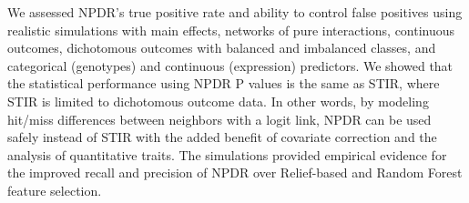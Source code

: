 \documentclass{bioinfo}
\begin{document}
We assessed NPDR's true positive rate and ability to control false positives using realistic simulations with main effects, networks of pure interactions, continuous outcomes, dichotomous outcomes with balanced and imbalanced classes, and categorical (genotypes) and continuous (expression) predictors.
We showed that the statistical performance using NPDR P values is the same as STIR, where STIR is limited to dichotomous outcome data.
In other words, by modeling hit/miss differences between neighbors with a logit link, NPDR can be used safely instead of STIR with the added benefit of covariate correction and the analysis of quantitative traits.
The simulations provided empirical evidence for the improved recall and precision of NPDR over Relief-based and Random Forest feature selection.

\end{document}
